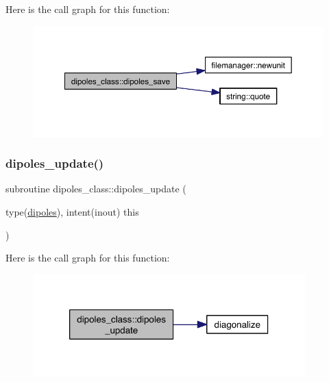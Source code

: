 Here is the call graph for this function\+:\nopagebreak
\begin{figure}[H]
\begin{center}
\leavevmode
\includegraphics[width=350pt]{namespacedipoles__class_a9ab428011961577796577f9cdeb032b4_cgraph}
\end{center}
\end{figure}
\mbox{\label{namespacedipoles__class_a9157bf14add87f3f26edfbc88c0da6fe}} 
\subsubsection{\texorpdfstring{dipoles\+\_\+update()}{dipoles\_update()}}
{\footnotesize\ttfamily subroutine dipoles\+\_\+class\+::dipoles\+\_\+update (\begin{DoxyParamCaption}\item[{type(\hyperlink{structdipoles__class_1_1dipoles}{dipoles}), intent(inout)}]{this }\end{DoxyParamCaption})\hspace{0.3cm}{\ttfamily [private]}}

Here is the call graph for this function\+:\nopagebreak
\begin{figure}[H]
\begin{center}
\leavevmode
\includegraphics[width=298pt]{namespacedipoles__class_a9157bf14add87f3f26edfbc88c0da6fe_cgraph}
\end{center}
\end{figure}
